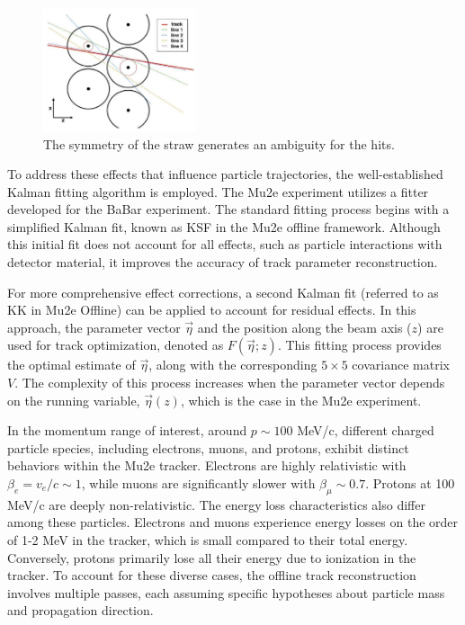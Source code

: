 \begin{figure}[!h]
    \centering
    \includegraphics[width =0.4\textwidth]{figures/png/Screenshot_20240810_171118.png}
    \caption[The symmetry of the straw generates an ambiguity for the hits.]{The 
    symmetry of the straw generates an ambiguity for the hits.}
    \label{fig:trackam}
\end{figure}
To address these effects that influence particle trajectories, 
the well-established Kalman fitting algorithm is employed. The 
Mu2e experiment utilizes a fitter developed for the BaBar experiment. 
The standard fitting process begins with a simplified Kalman fit, 
known as KSF in the Mu2e offline framework. Although this initial 
fit does not account for all effects, such as particle interactions 
with detector material, it improves the accuracy of track parameter reconstruction.

For more comprehensive effect corrections, a second Kalman fit 
(referred to as KK in Mu2e Offline) can be applied to account 
for residual effects. In this approach, the parameter vector 
$\vec{\eta}$ and the position along the beam axis ($z$) are used 
for track optimization, denoted as $F(\vec{\eta}; z)$. This fitting 
process provides the optimal estimate of $\vec{\eta}$, along with 
the corresponding $5 \times 5$ covariance matrix $V$. The 
complexity of this process increases when the parameter vector 
depends on the running variable, $\vec{\eta}(z)$, which is the 
case in the Mu2e experiment.

In the momentum range of interest, around $p \sim 100$ MeV/c, 
different charged particle species, including electrons, muons, 
and protons, exhibit distinct behaviors within the Mu2e tracker. 
Electrons are highly relativistic with $\beta_e = v_e/c \sim 1$, 
while muons are significantly slower with $\beta_\mu \sim 0.7$. 
Protons at 100 MeV/c are deeply non-relativistic. The energy loss 
characteristics also differ among these particles. Electrons and 
muons experience energy losses on the order of 1-2 MeV in the tracker, 
which is small compared to their total energy. Conversely, protons 
primarily lose all their energy due to ionization in the tracker. 
To account for these diverse cases, the offline track reconstruction 
involves multiple passes, each assuming specific hypotheses about 
particle mass and propagation direction.



